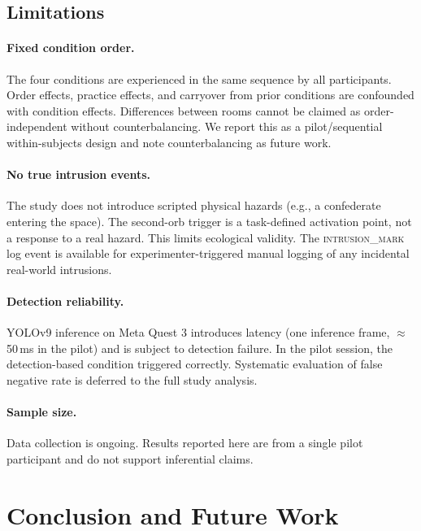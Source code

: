 \documentclass{styling/vgtc} %
\begin{document}
\subsection{Limitations}
\label{sec:limitations}

\paragraph{Fixed condition order.}
The four conditions are experienced in the same sequence by all
participants. Order effects, practice effects, and carryover from prior
conditions are confounded with condition effects. Differences between
rooms cannot be claimed as order-independent without counterbalancing.
We report this as a pilot/sequential within-subjects design and note
counterbalancing as future work.

\paragraph{No true intrusion events.}
The study does not introduce scripted physical hazards (e.g., a
confederate entering the space). The second-orb trigger is a
task-defined activation point, not a response to a real hazard. This
limits ecological validity. The \textsc{intrusion\_mark} log event is
available for experimenter-triggered manual logging of any incidental
real-world intrusions.

\paragraph{Detection reliability.}
YOLOv9 inference on Meta Quest 3 introduces latency (one inference
frame, $\approx$50\,ms in the pilot) and is subject to detection failure.
In the pilot session, the detection-based condition triggered correctly.
Systematic evaluation of false negative rate is deferred to the full
study analysis.

\paragraph{Sample size.}
Data collection is ongoing. Results reported here are from a single
pilot participant and do not support inferential claims.


\section{Conclusion and Future Work}
\label{sec:conclusion}
\end{document}
